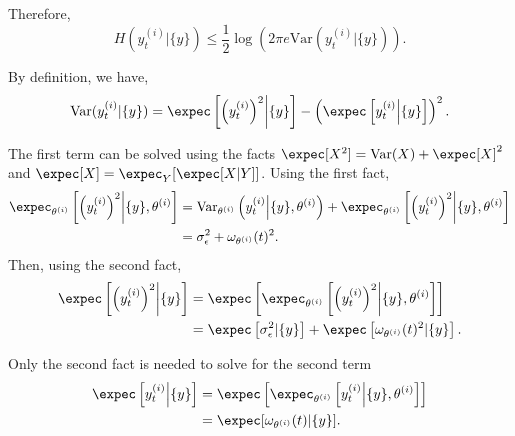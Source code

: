 \documentclass[11pt,notitlepage]{article}
\newcommand{\varr}{\text{Var}}
\begin{document}
Therefore, 
\begin{equation*}
    H(y_t^{(i)} | \{y\}) \leq \frac{1}{2} \log\left( 2 \pi e \varr(y_t^{(i)} | \{y\}) \right).
\end{equation*}

By definition, we have,
\begin{equation*}
    \varr(y_t^{(i)} | \{y\}) = \expec\left[ \left(y_t^{(i)} \right)^2 \middle| \{y\}  \right] - \left(\expec\left[ y_t^{(i)} \middle| \{y\}\right] \right)^2.
\end{equation*}

The first term can be solved using the facts $\expec[X^2] = \varr(X) +  \expec[X]^2$ and $\expec[X] = \expec_Y[\expec[X | Y]]$.
Using the first fact,
\begin{equation*}
    \begin{split}
        \expec_{\theta^{(i)}}\left[ \left(y_t^{(i)} \right)^2 \middle| \{y\}, \theta^{(i)}  \right] &= \varr_{\theta^{(i)}}\left( y_t^{(i)} \middle| \{y\}, \theta^{(i)}  \right) + \expec_{\theta^{(i)}}\left[ \left(y_t^{(i)} \right)^2 \middle| \{y\}, \theta^{(i)}  \right] \\
        &= \sigma_\epsilon^2 + \omega_{\theta^{(i)}}(t)^2.
    \end{split}
\end{equation*}
Then, using the second fact,
\begin{equation*}
    \begin{split}
        \expec\left[ \left(y_t^{(i)} \right)^2 \middle| \{y\} \right] &= \expec\left[\expec_{\theta^{(i)}}\left[ \left(y_t^{(i)} \right)^2 \middle| \{y\}, \theta^{(i)}  \right] \right] \\
        &= \expec\left[\sigma_\epsilon^2 | \{y\}\right] + \expec\left[\omega_{\theta^{(i)}}(t)^2 | \{y\}\right].
    \end{split}
\end{equation*}

Only the second fact is needed to solve for the second term
\begin{equation*}
    \begin{split}
       \expec\left[ y_t^{(i)} \middle| \{y\}\right] &= \expec\left[ \expec_{\theta^{(i)}}\left[ y_t^{(i)} \middle| \{y\}, \theta^{(i)}\right]\right] \\
        &= \expec[ \omega_{\theta^{(i)}}(t) | \{y\} ].
    \end{split}
\end{equation*}
\end{document}
